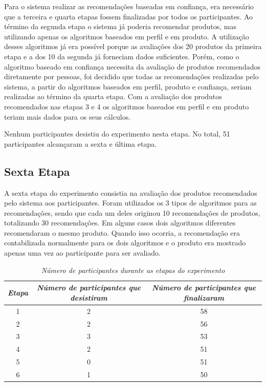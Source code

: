 Para o sistema realizar as recomendações baseadas em confiança, era necessário que a terceira e quarta etapas fossem finalizadas por todos os participantes. Ao término da segunda etapa o sistema já poderia recomendar produtos, mas utilizando apenas os algoritmos baseados em perfil e em produto. A utilização desses algoritmos já era possível porque as avaliações dos 20 produtos da primeira etapa e a dos 10 da segunda já forneciam dados suficientes. Porém, como o algoritmo baseado em confiança necessita da avaliação de produtos recomendados diretamente por pessoas, foi decidido que todas as recomendações realizadas pelo sistema, a partir do algoritmos baseados em perfil, produto e confiança, seriam realizadas ao término da quarta etapa. Com a avaliação dos produtos recomendados nas etapas 3 e 4 os algoritmos baseados em perfil e em produto teriam mais dados para os seus cálculos.

Nenhum participantes desistiu do experimento nesta etapa. No total, 51 participantes alcançaram a sexta e última etapa.

\subsection{Sexta Etapa}

A sexta etapa do experimento consistia na avaliação dos produtos recomendados pelo sistema aos participantes. Foram utilizados os 3 tipos de algoritmos para as recomendações, sendo que cada um deles originou 10 recomendações de produtos, totalizando 30 recomendações. Em alguns casos dois algoritmos diferentes recomendaram o mesmo produto. Quando isso ocorria, a recomendação era contabilizada normalmente para os dois algoritmos e o produto era mostrado apenas uma vez ao participante para ser avaliado.

\begin{table}
\centering
\begin{tabular}{|c|c|c|}
	\hline
	\em Etapa	&	\em Número de participantes que desistiram	&	\em Número de participantes que finalizaram	\\
	\hline
	1	&	2	&	58	\\
	\hline
	2	&	2	&	56	\\
	\hline
	3	&	3	&	53	\\
	\hline
	4	&	2	&	51	\\
	\hline
	5	&	0	&	51	\\
	\hline
	6	&	1	&	50	\\
	\hline
\end{tabular}
\caption{\it Número de participantes durante as etapas do experimento}
\label{table:participantes}
\end{table}

